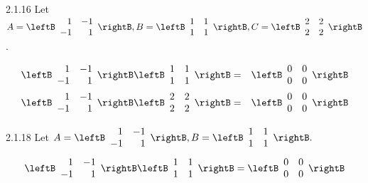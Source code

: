 \begin{Answer}{2.1.16}
Let $A = \leftB
\begin{array}{rr}
1 & -1 \\
-1 & 1
\end{array}
\rightB, B = \leftB
\begin{array}{cc}
1 & 1 \\
1 & 1
\end{array}
\rightB, C = \leftB
\begin{array}{cc}
2 & 2 \\
2 & 2
\end{array}
\rightB$.

\begin{eqnarray*}
\leftB
\begin{array}{rr}
1 & -1 \\
-1 & 1
\end{array}
\rightB \leftB
\begin{array}{cc}
1 & 1 \\
1 & 1
\end{array}
\rightB  &=& \leftB
\begin{array}{cc}
0 & 0 \\
0 & 0
\end{array}
\rightB \\
 \leftB
\begin{array}{rr}
1 & -1 \\
-1 & 1
\end{array}
\rightB \leftB
\begin{array}{cc}
2 & 2 \\
2 & 2
\end{array}
\rightB &=& \leftB
\begin{array}{cc}
0 & 0 \\
0 & 0
\end{array}
\rightB
\end{eqnarray*}
\end{Answer}
\begin{Answer}{2.1.18}
Let $A = \leftB
\begin{array}{rr}
1 & -1 \\
-1 & 1
\end{array}
\rightB, B = \leftB
\begin{array}{cc}
1 & 1 \\
1 & 1
\end{array}
\rightB.$
\[
\leftB
\begin{array}{rr}
1 & -1 \\
-1 & 1
\end{array}
\rightB \leftB
\begin{array}{cc}
1 & 1 \\
1 & 1
\end{array}
\rightB =\allowbreak \leftB
\begin{array}{cc}
0 & 0 \\
0 & 0
\end{array}
\rightB
\]
\end{Answer}
